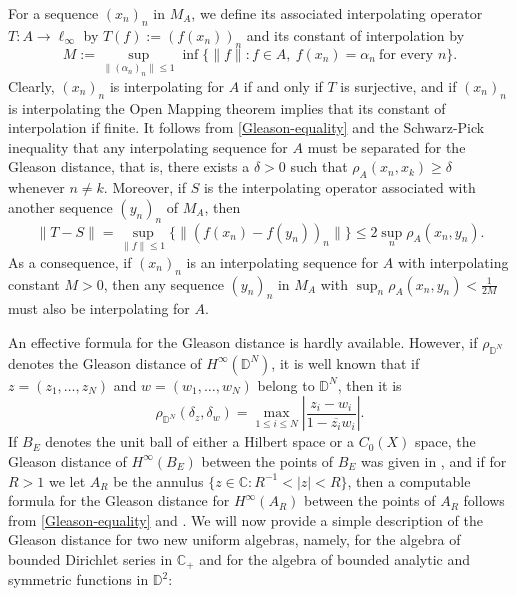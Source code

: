 \documentclass[preprint,12pt,number]{elsarticle}
\newcommand{\C}{\mathbb{C}}
\newcommand{\D}{\mathbb{D}}
\begin{document}
For a sequence $(x_n)_n$ in $M_A$, we define its associated interpolating operator $T:A\to \ell_\infty$ by $T(f):=(f(x_n))_n$ and its constant of interpolation by  $$ M:=\sup_{\lVert(\alpha_n)_n\rVert\leq1}\inf\{\lVert f \rVert:f\in A, \ f(x_n)=\alpha_n\ \mbox{for every } n\}.$$ Clearly, $(x_n)_n$ is interpolating for $A$ if and only if $T$ is surjective, and if $(x_n)_n$ is interpolating the Open Mapping theorem implies that its constant of interpolation if finite. It follows from \eqref{Gleason-equality}  and the Schwarz-Pick inequality that any interpolating sequence for $A$ must be separated  for the Gleason distance, that is, there exists a $\delta>0$ such that $\rho_A(x_n,x_k)\geq \delta$ whenever $n\neq k$. Moreover, if $S$ is the interpolating operator associated with another sequence $(y_n)_n$ of $M_A$, then 
\[
\lVert T-S \rVert=\sup_{\lVert f \rVert\leq 1}\{ \lVert (f(x_n)-f(y_n))_n \rVert \}\leq 2\sup_n\rho_A(x_n,y_n).
\] As a consequence, if $(x_n)_n$ is an interpolating sequence for $A$ with interpolating constant $M>0$, then any sequence $(y_n)_n$ in $M_A$ with $\sup_n\rho_A(x_n,y_n)<\frac{1}{2M}$ must also be interpolating for $A$. %

An effective formula for the Gleason distance is hardly available. However, if $\rho_{\D^N}$ denotes the Gleason distance of $H^\infty(\D^N)$, it is well known that if $z=(z_1,\ldots,z_N)$ and $w=(w_1,\ldots,w_N)$ belong to $\D^N$, then it is 
\[
\rho_{\D^N}(\delta_z,\delta_w)=\max_{1\leq i\leq N}\left| \frac{z_i-w_i}{1-\overline{z_i}w_i}\right|.
\] 
If $B_E$ denotes the unit ball of either a Hilbert space or a $C_0(X)$ space, the Gleason distance of $H^\infty(B_E)$ between the points of $B_E$ was given in \cite{AronGalindoLindstrom2003}, and if for $R>1$ we let $A_R$ be the annulus $\{z\in \C: R^{-1}<|z|<R\}$, then a computable formula for the Gleason distance for $H^\infty(A_R)$ between the points of $A_R$ follows from \eqref{Gleason-equality} and \cite{Simha1975}. We will now provide a simple description of the Gleason distance for two new uniform algebras, namely, for the algebra of bounded Dirichlet series in $\C_+$ and for the algebra of bounded analytic and symmetric functions in $\D^2$:
\end{document}
